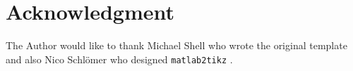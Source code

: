\section*{Acknowledgment}

The Author would like to thank Michael Shell who wrote the original template \cite{IEEEhowto:IEEEtranpage} and also Nico Schlömer who designed \texttt{matlab2tikz} \cite{m2tikz}.
